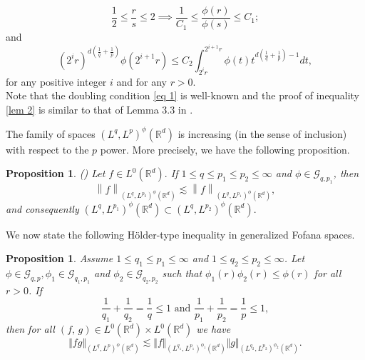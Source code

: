 \documentclass[10pt,a4paper]{amsart}
\numberwithin{equation}{section}
\newtheorem{proposition}[theorem]{Proposition}
\numberwithin{equation}{section}
\begin{document}
 \begin{equation}\label{eq 1}
 \frac{1}{2} \leq \frac{r}{s} \leq 2 \implies \frac{1}{C_1} \leq \frac{\phi (r)}{\phi(s)} \leq C_1;
 \end{equation}
 and  
\begin{equation}
\label{lem 2}
  (2^{i}r)^{d(\frac{1}{q}+\frac{1}{p})} \phi(2^{i+1}r) \leq C_2 \displaystyle\int_{2^{i}r}^{2^{i+1}r} \phi(t)t^{d(\frac{1}{q}+\frac{1}{p})-1} dt, 
 \end{equation}  
for any positive integer $i$ and for any $r>0$.\\
Note that the doubling condition \eqref{eq 1} is well-known and the proof of inequality \eqref{lem 2} is similar to that of Lemma 3.3 in \cite{NKD}.


The family of spaces $ (L^{q},L^{p})^{\phi}(\mathbb{R}^{d}) $ is increasing (in the sense of inclusion) with respect to the $ p $ power. More precisely, we have the following proposition. 
 \begin{proposition}(\cite[Proposition 2.7 (2)]{NKD})
 \label{prop 1}
 Let  $ f \in L^{0}(\mathbb{R}^{d}). $ If $1\leq q\leq p_{1} \leq p_{2} \leq\infty$ and $ \phi \in \mathcal{G}_{q,p_{1}} $, then 
 $$\left\| f \right\|_{(L^{q},L^{p_{2}})^{\phi}(\mathbb{R}^{d})} \lesssim \left\|f\right\|_{(L^{q},L^{p_{1}})^{\phi}(\mathbb{R}^{d})},$$ and consequently $(L^{q},L^{p_{1}})^{\phi}(\mathbb{R}^{d})\subset (L^{q},L^{p_{2}})^{\phi}(\mathbb{R}^{d}).$
 \end{proposition}
We now state the following H\"older-type inequality in generalized Fofana spaces.
\begin{proposition}\label{prop 2}
Assume $1\leq q_{1} \leq p_{1}\leq \infty$ and $1\leq q_{2} \leq p_{2}\leq \infty$.
Let $\phi \in \mathcal{G}_{q,p} , \phi_{1} \in \mathcal{G}_{q_{1},p_{1}} $ and $\phi_{2} \in \mathcal{G}_{q_{2},p_{2}} $ such that $\phi_{1}(r) \phi_{2}(r) \leq \phi(r) $ for all $r>0$. If
	$$\frac{1}{q_{1}} + \frac{1}{q_{2}} = \frac{1}{q} \leq 1  \text{ and } \frac{1}{p_{1}} + \frac{1}{p_{2}} = \frac{1}{p} \leq 1,$$
then for all $(f,\,g) \in L^{0} (\mathbb{R}^{d})\times L^{0} (\mathbb{R}^{d})$ we have
	$$\Vert f g\Vert_{(L^{q},L^{p})^{\phi}(\mathbb{R}^{d})} \lesssim \Vert f \Vert_{(L^{q_{1}},L^{p_{1}})^{\phi_{1}}(\mathbb{R}^{d}) } \Vert g \Vert_{(L^{q_{2}},L^{p_{2}})^{\phi_{2}}(\mathbb{R}^{d})}.$$
\end{proposition}
\end{document}
